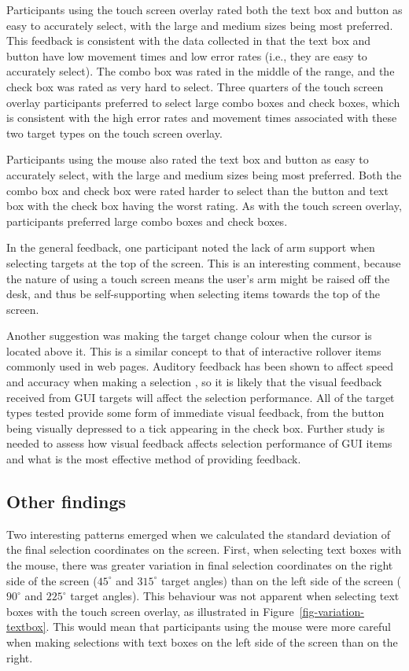 \documentclass{elsart}
\begin{document}
Participants using the touch screen overlay rated both the text box and
button as easy to accurately select, with the large and medium sizes
being most preferred. This feedback is consistent with the data
collected in that the text box and button have low movement times and
low error rates (i.e., they are easy to accurately select). The combo
box was rated in the middle of the range, and the check box was rated as
very hard to select. Three quarters of the touch screen overlay
participants preferred to select large combo boxes and check boxes,
which is consistent with the high error rates and movement times
associated with these two target types on the touch screen overlay.

Participants using the mouse also rated the text box and button as easy
to accurately select, with the large and medium sizes being most
preferred. Both the combo box and check box were rated harder to select
than the button and text box with the check box having the worst rating.
As with the touch screen overlay, participants preferred large combo
boxes and check boxes.

In the general feedback, one participant noted the lack of arm support
when selecting targets at the top of the screen. This is an interesting
comment, because the nature of using a touch screen means the user's arm
might be raised off the desk, and thus be self-supporting when selecting
items towards the top of the screen.

Another suggestion was making the target change colour when the cursor
is located above it. This is a similar concept to that of interactive
rollover items commonly used in web pages. Auditory feedback has been
shown to affect speed and accuracy when making a selection
\citep{Bend-G-1999-PhD}, so it is likely that the visual feedback
received from GUI targets will affect the selection performance. All of
the target types tested provide some form of immediate visual feedback,
from the button being visually depressed to a tick appearing in the
check box. Further study is needed to assess how visual feedback affects
selection performance of GUI items and what is the most effective method of
providing feedback.


\subsection{Other findings}
\label{sec-results-other}

Two interesting patterns emerged when we calculated the standard
deviation of the final selection coordinates on the screen. First, when
selecting text boxes with the mouse, there was greater variation in
final selection coordinates on the right side of the screen
(\(45^{\circ}\) and \(315^{\circ}\) target angles) than on the left side
of the screen (\(90^{\circ}\) and \(225^{\circ}\) target angles). This
behaviour was not apparent when selecting text boxes with the touch
screen overlay, as illustrated in Figure~\ref{fig-variation-textbox}.
This would mean that participants using the mouse were more careful when
making selections with text boxes on the left side of the screen than on
the right.
\end{document}
